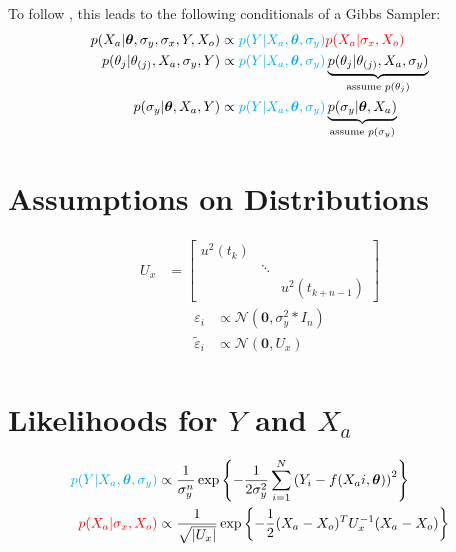 \documentclass[10pt]{article}
\renewcommand{\vec}[1]{\boldsymbol{#1}}
\newcommand{\mat}[1]{#1}
\begin{document}
    To follow \cite{dellaportas_1995}, this leads to the following conditionals of a Gibbs Sampler:
    \begin{align}
        p(X_a | \vec{\theta}, \sigma_y, \sigma_x, Y, X_o) &\propto {\color{cyan} p(Y | X_a, \vec{\theta}, \sigma_y)} {\color{red} p(X_a | \sigma_x, X_o)} \\
        p(\theta_j | \theta_{(j)}, X_a, \sigma_y, Y) &\propto {\color{cyan} p(Y | X_a, \vec{\theta}, \sigma_y)} \underbrace{p(\theta_j | \theta_{(j)}, X_a, \sigma_{y})}_{\text{assume } p(\theta_j)} \\
        p(\sigma_y | \vec{\theta}, X_a, Y) &\propto {\color{cyan} p(Y | X_a, \vec{\theta}, \sigma_y)} \underbrace{p(\sigma_y | \vec{\theta}, X_a)}_{\text{assume } p(\sigma_y)} 
    \end{align}
    
    
    \section{Assumptions on Distributions}
    \begin{align}
        \mat{U_x} &= \begin{bmatrix} u^2(t_k) && \\ &\ddots& \\ && u^2(t_{k+n-1}) \end{bmatrix} 
    \end{align}
    \begin{align}
        \varepsilon_i &\propto \mathcal{N}(\vec{0}, \sigma_y^2 * I_n)\\
        \tilde{\varepsilon}_i &\propto \mathcal{N}(\vec{0}, \mat{U_x}) \\
    \end{align}
    
    
    \section{Likelihoods for $Y$ and $X_a$}
    \begin{align}
        {\color{cyan} p(Y | X_a, \vec{\theta}, \sigma_y)} &\propto \frac{1}{\sigma_y^n} \exp\left\{ - \frac{1}{2\sigma_y^2} \sum_{i=1}^N \left( Y_i - f(X_ai, \vec{\theta}) \right)^2 \right\} \\
        {\color{red} p(X_a | \sigma_x, X_o)} &\propto \frac{1}{\sqrt{|\mat{U_x}|}} \exp\left\{ - \frac{1}{2} (X_a - X_o)^T \mat{U_x}^{-1} (X_a - X_o) \right\}
    \end{align}    
    
\end{document}
